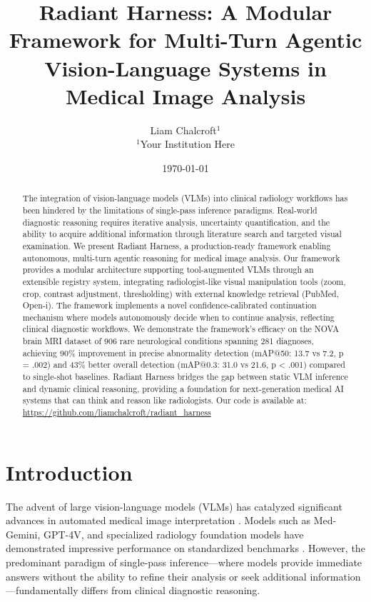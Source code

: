 \documentclass[11pt]{article}
\title{Radiant Harness: A Modular Framework for Multi-Turn Agentic Vision-Language Systems in Medical Image Analysis}
\author{
  Liam Chalcroft$^{1}$
  \\
  $^{1}$Your Institution Here
}
\date{\today}
\begin{document}
\maketitle

\begin{abstract}
The integration of vision-language models (VLMs) into clinical radiology workflows has been hindered by the limitations of single-pass inference paradigms. Real-world diagnostic reasoning requires iterative analysis, uncertainty quantification, and the ability to acquire additional information through literature search and targeted visual examination. We present Radiant Harness, a production-ready framework enabling autonomous, multi-turn agentic reasoning for medical image analysis. Our framework provides a modular architecture supporting tool-augmented VLMs through an extensible registry system, integrating radiologist-like visual manipulation tools (zoom, crop, contrast adjustment, thresholding) with external knowledge retrieval (PubMed, Open-i). The framework implements a novel confidence-calibrated continuation mechanism where models autonomously decide when to continue analysis, reflecting clinical diagnostic workflows. We demonstrate the framework's efficacy on the NOVA brain MRI dataset of 906 rare neurological conditions spanning 281 diagnoses, achieving 90\% improvement in precise abnormality detection (mAP@50: 13.7 vs 7.2, p = .002) and 43\% better overall detection (mAP@0.3: 31.0 vs 21.6, p < .001) compared to single-shot baselines. Radiant Harness bridges the gap between static VLM inference and dynamic clinical reasoning, providing a foundation for next-generation medical AI systems that can think and reason like radiologists. Our code is available at: \url{https://github.com/liamchalcroft/radiant_harness}
\end{abstract}

\section{Introduction}
\label{sec:introduction}

The advent of large vision-language models (VLMs) has catalyzed significant advances in automated medical image interpretation \citep{saab2024capabilities, yang2024advancing}. Models such as Med-Gemini, GPT-4V, and specialized radiology foundation models have demonstrated impressive performance on standardized benchmarks \citep{johnson2019mimic}. However, the predominant paradigm of single-pass inference---where models provide immediate answers without the ability to refine their analysis or seek additional information---fundamentally differs from clinical diagnostic reasoning.
\end{document}
